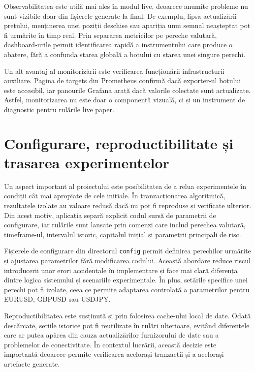 Observabilitatea este utilă mai ales în modul live, deoarece anumite probleme nu sunt vizibile doar din fișierele generate la final. De exemplu, lipsa actualizării prețului, menținerea unei poziții deschise sau apariția unui semnal neașteptat pot fi urmărite în timp real. Prin separarea metricilor pe pereche valutară, dashboard-urile permit identificarea rapidă a instrumentului care produce o abatere, fără a confunda starea globală a botului cu starea unei singure perechi.

Un alt avantaj al monitorizării este verificarea funcționării infrastructurii auxiliare. Pagina de targets din Prometheus confirmă dacă exporter-ul botului este accesibil, iar panourile Grafana arată dacă valorile colectate sunt actualizate. Astfel, monitorizarea nu este doar o componentă vizuală, ci și un instrument de diagnostic pentru rulările live paper.

\section{Configurare, reproductibilitate și trasarea experimentelor}
\label{cap:cap3:reproductibilitate}

Un aspect important al proiectului este posibilitatea de a relua experimentele în condiții cât mai apropiate de cele inițiale. În tranzacționarea algoritmică, rezultatele izolate au valoare redusă dacă nu pot fi reproduse și verificate ulterior. Din acest motiv, aplicația separă explicit codul sursă de parametrii de configurare, iar rulările sunt lansate prin comenzi care includ perechea valutară, timeframe-ul, intervalul istoric, capitalul inițial și parametrii principali de risc.

Fișierele de configurare din directorul \texttt{config} permit definirea perechilor urmărite și ajustarea parametrilor fără modificarea codului. Această abordare reduce riscul introducerii unor erori accidentale în implementare și face mai clară diferența dintre logica sistemului și scenariile experimentale. În plus, setările specifice unei perechi pot fi izolate, ceea ce permite adaptarea controlată a parametrilor pentru EURUSD, GBPUSD sau USDJPY.

Reproductibilitatea este susținută și prin folosirea cache-ului local de date. Odată descărcate, seriile istorice pot fi reutilizate în rulări ulterioare, evitând diferențele care ar putea apărea din cauza actualizărilor furnizorului de date sau a problemelor de conectivitate. În contextul lucrării, această decizie este importantă deoarece permite verificarea acelorași tranzacții și a acelorași artefacte generate.

